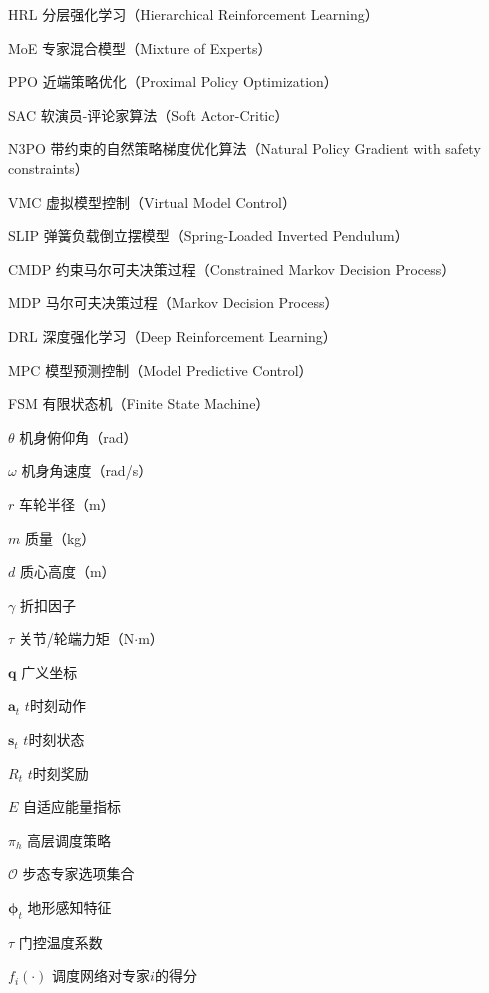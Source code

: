 \begin{denotation}
\item[HRL] 分层强化学习（Hierarchical Reinforcement Learning）
\item[MoE] 专家混合模型（Mixture of Experts）
\item[PPO] 近端策略优化（Proximal Policy Optimization）
\item[SAC] 软演员-评论家算法（Soft Actor-Critic）
\item[N3PO] 带约束的自然策略梯度优化算法（Natural Policy Gradient with safety constraints）
\item[VMC] 虚拟模型控制（Virtual Model Control）
\item[SLIP] 弹簧负载倒立摆模型（Spring-Loaded Inverted Pendulum）
\item[CMDP] 约束马尔可夫决策过程（Constrained Markov Decision Process）
\item[MDP] 马尔可夫决策过程（Markov Decision Process）
\item[DRL] 深度强化学习（Deep Reinforcement Learning）
\item[MPC] 模型预测控制（Model Predictive Control）
\item[FSM] 有限状态机（Finite State Machine）
\item[$\theta$] 机身俯仰角（rad）
\item[$\omega$] 机身角速度（rad/s）
\item[$r$] 车轮半径（m）
\item[$m$] 质量（kg）
\item[$d$] 质心高度（m）
\item[$\gamma$] 折扣因子
\item[$\tau$] 关节/轮端力矩（N$\cdot$m）
\item[$\boldsymbol{q}$] 广义坐标
\item[$\boldsymbol{a}_t$] $t$时刻动作
\item[$\boldsymbol{s}_t$] $t$时刻状态
\item[$R_t$] $t$时刻奖励
\item[$E$] 自适应能量指标
\item[$\pi_h$] 高层调度策略
\item[$\mathcal{O}$] 步态专家选项集合
\item[$\boldsymbol{\phi}_t$] 地形感知特征
\item[$\tau$] 门控温度系数
\item[$f_i(\cdot)$] 调度网络对专家$i$的得分
\end{denotation}
